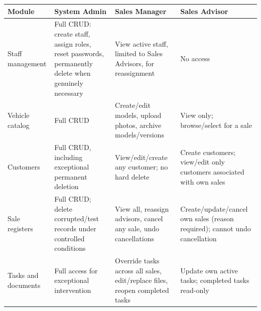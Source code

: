\documentclass[11pt,a4paper]{article}
\begin{document}
\begin{longtable}{@{}L{2.6cm}L{4.5cm}L{4.4cm}L{4.3cm}@{}}
	\toprule
	\textbf{Module}                                                   & \textbf{System Admin}                                                                               & \textbf{Sales Manager}                                                      & \textbf{Sales
		                                                                                                                                                                                                                                                        Advisor}                                                               \\
	\midrule
	\endhead
	Staff management                                                  & Full CRUD: create staff, assign roles, reset passwords, permanently delete when genuinely necessary & View active staff, limited to Sales Advisors, for reassignment              & No access                                                                  \\
	Vehicle catalog                                                   & Full CRUD                                                                                           & Create/edit models, upload photos, archive models/versions                  & View only; browse/select for a sale                                        \\
	Customers                                                         & Full CRUD, including exceptional permanent deletion                                                 &
	View/edit/create any customer; no hard delete                     & Create customers; view/edit only
	customers associated with own sales                                                                                                                                                                                                                                                                                                \\
	Sale registers                                                    & Full CRUD; delete corrupted/test records under controlled conditions                                & View all, reassign advisors, cancel any sale, undo cancellations            & Create/update/cancel own sales (reason required); cannot undo cancellation \\
	Tasks and documents                                               & Full access for exceptional intervention                                                            & Override tasks across all sales, edit/replace files, reopen completed tasks & Update own active tasks; completed tasks read-only                         \\

\end{longtable}
\end{document}
